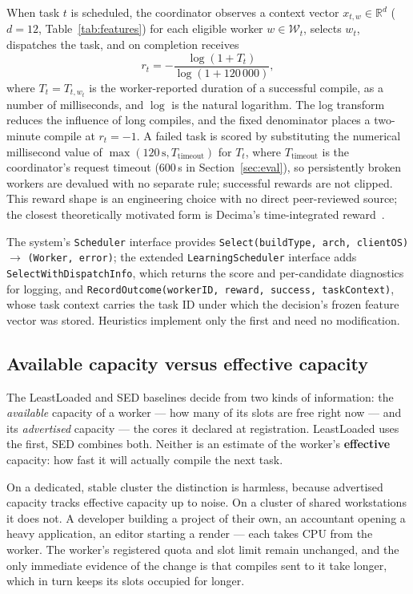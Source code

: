 \documentclass[final,5p,times,twocolumn]{elsarticle}
\begin{document}
When task $t$ is scheduled, the coordinator observes a context vector $x_{t,w}\in\mathbb{R}^d$ ($d=12$, Table~\ref{tab:features}) for each eligible worker $w\in\mathcal{W}_t$, selects $w_t$, dispatches the task, and on completion receives
\begin{equation}
r_t=-\frac{\log(1+T_t)}{\log(1+120\,000)},
\end{equation}
where $T_t=T_{t,w_t}$ is the worker-reported duration of a successful compile, as a number of milliseconds, and $\log$ is the natural logarithm. The log transform reduces the influence of long compiles, and the fixed denominator places a two-minute compile at $r_t=-1$. A failed task is scored by substituting the numerical millisecond value of $\max(120\,\text{s},T_{\text{timeout}})$ for $T_t$, where $T_{\text{timeout}}$ is the coordinator's request timeout (600\,s in Section~\ref{sec:eval}), so persistently broken workers are devalued with no separate rule; successful rewards are not clipped. This reward shape is an engineering choice with no direct peer-reviewed source; the closest theoretically motivated form is Decima's time-integrated reward~\cite{decima}.

The system's \texttt{Scheduler} interface provides \texttt{Select(buildType, arch, clientOS)} $\to$ \texttt{(Worker, error)}; the extended \texttt{LearningScheduler} interface adds \texttt{SelectWithDispatchInfo}, which returns the score and per-candidate diagnostics for logging, and \texttt{RecordOutcome(workerID, reward, success, taskContext)}, whose task context carries the task ID under which the decision's frozen feature vector was stored. Heuristics implement only the first and need no modification.

\subsection{Available capacity versus effective capacity}
\label{sec:capacity}

The LeastLoaded and SED baselines decide from two kinds of information: the \emph{available} capacity of a worker --- how many of its slots are free right now --- and its \emph{advertised} capacity --- the cores it declared at registration. LeastLoaded uses the first, SED combines both. Neither is an estimate of the worker's \textbf{effective} capacity: how fast it will actually compile the next task.

On a dedicated, stable cluster the distinction is harmless, because advertised capacity tracks effective capacity up to noise. On a cluster of shared workstations it does not. A developer building a project of their own, an accountant opening a heavy application, an editor starting a render --- each takes CPU from the worker. The worker's registered quota and slot limit remain unchanged, and the only immediate evidence of the change is that compiles sent to it take longer, which in turn keeps its slots occupied for longer.
\end{document}

